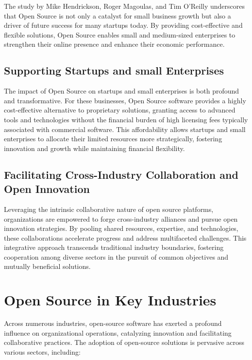 The study \cite{opensource_hendrickson2012economic} by Mike Hendrickson, Roger Magoulas, 
and Tim O'Reilly underscores that Open Source is not only a catalyst for small business growth but also a driver of future success for many startups today. 
By providing cost-effective and flexible solutions,
Open Source enables small and medium-sized enterprises to strengthen their online presence and enhance their economic performance.


\subsection{Supporting Startups and small Enterprises}

The impact of Open Source on startups and small enterprises is both profound and transformative. 
For these businesses, Open Source software provides a highly cost-effective alternative to proprietary solutions, 
granting access to advanced tools and technologies without the financial burden of high licensing fees typically associated with commercial software. 
This affordability allows startups and small enterprises to allocate their limited resources more strategically,
fostering innovation and growth while maintaining financial flexibility.

\cite{studiolabs_open_source_startups_2024}

\subsection{Facilitating Cross-Industry Collaboration and Open Innovation}

Leveraging the intrinsic collaborative nature of open source platforms, organizations are empowered to forge cross-industry alliances and pursue open innovation 
strategies. By pooling shared resources, expertise, and technologies, these collaborations accelerate progress and address multifaceted challenges. 
This integrative approach transcends traditional industry boundaries, fostering cooperation among diverse sectors in the pursuit of common objectives and mutually beneficial solutions.

\section{Open Source in Key Industries}

Across numerous industries, open-source software has exerted a profound influence on organizational operations, catalyzing innovation and facilitating collaborative practices. The adoption of open-source solutions is pervasive across various sectors, including: 


